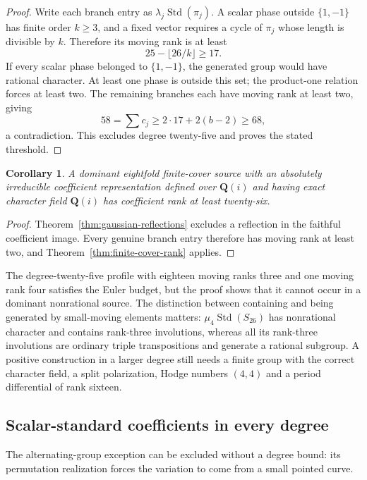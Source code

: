 \documentclass[11pt]{article}
\newtheorem{corollary}[theorem]{Corollary}
\theoremstyle{definition}
\theoremstyle{remark}
\newcommand{\Q}{\mathbf Q}
\begin{document}
\begin{proof}
Write each branch entry as $\lambda_j\operatorname{Std}(\pi_j)$.
A scalar phase outside $\{1,-1\}$ has finite order $k\ge3$, and a
fixed vector requires a cycle of $\pi_j$ whose length is divisible
by $k$. Therefore its moving rank is at least
\[
 25-\lfloor26/k\rfloor\ge17.
\]
If every scalar phase belonged to $\{1,-1\}$, the generated group
would have rational character. At least one phase is outside this
set; the product-one relation forces at least two. The remaining
branches each have moving rank at least two, giving
\[
 58=\sum c_j\ge2\cdot17+2(b-2)\ge68,
\]
a contradiction. This excludes degree twenty-five and proves the
 stated threshold.
\end{proof}

\begin{corollary}\label{cor:gaussian-cover-rank}
A dominant eightfold finite-cover source with an absolutely irreducible coefficient representation defined over $\Q(i)$ and having exact character field $\Q(i)$ has coefficient rank at least twenty-six.
\end{corollary}
\begin{proof}
Theorem~\ref{thm:gaussian-reflections} excludes a reflection in the faithful coefficient image. Every genuine branch entry therefore has moving rank at least two, and Theorem~\ref{thm:finite-cover-rank} applies.
\end{proof}

The degree-twenty-five profile with eighteen moving ranks three and
one moving rank four satisfies the Euler budget, but the proof shows
that it cannot occur in a dominant nonrational source. The distinction
between containing and being generated by small-moving elements matters:
$\mu_4\operatorname{Std}(S_{26})$ has nonrational character and contains
rank-three involutions, whereas all its rank-three involutions are
ordinary triple transpositions and generate a rational subgroup. A
positive construction in a larger degree still needs a finite group
with the correct character field, a split polarization, Hodge numbers
$(4,4)$ and a period differential of rank sixteen.



\subsection{Scalar-standard coefficients in every degree}

The alternating-group exception can be excluded without a degree
bound: its permutation realization forces the variation to come
from a small pointed curve.
\end{document}
